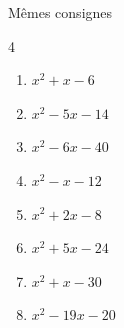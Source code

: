 \documentclass[main.tex]{subfiles}
\begin{document}
\begin{exercise}[À vous]\label{chapitre03:exercice:factorisationparessaierreur:niveau02} \label{chapitre03:factorisation:essaierreur02} Mêmes consignes\vspace{-0.5em}
	\begin{multicols}{4} 
		\begin{enumerate}[label={$\Alph*(x)=$\rule{0pt}{1.8em}}, leftmargin=*] 
			\item $x^2+x-6$
			\item $x^2-5x-14$
			\item $x^2-6x-40$
			\item $x^2-x-12$ 
			\item $x^2+2x-8$
			\item $x^2+5x-24$
			\item $x^2+x-30$
			\item $x^2-19x-20$
		\end{enumerate}
	\end{multicols}\vspace{-1.5em}
\end{exercise}
\end{document}
